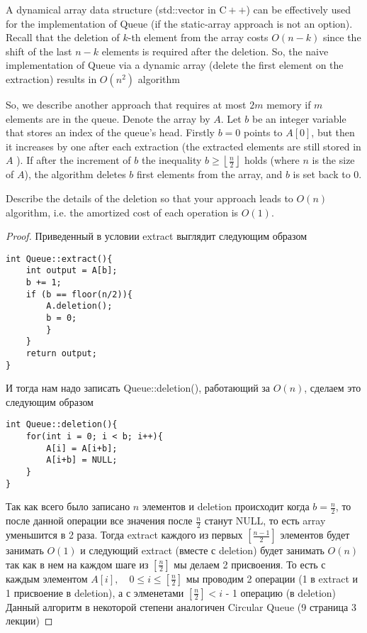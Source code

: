 \begin{prob}
A dynamical array data structure (std::vector in $\mathrm{C}++$) can be effectively used for the implementation of Queue (if the static-array approach is not an option). Recall that the deletion of $k$-th element from the array costs $O(n-k)$ since the shift of the last $n-k$ elements is required after the deletion. So, the naive implementation of Queue via a dynamic array (delete the first element on the extraction) results in $O\left(n^2\right)$ algorithm

So, we describe another approach that requires at most $2 m$ memory if $m$ elements are in the queue. Denote the array by $A$. Let $b$ be an integer variable that stores an index of the queue's head. Firstly $b=0$ points to $A[0]$, but then it increases by one after each extraction (the extracted elements are still stored in $A$ ). If after the increment of $b$ the inequality $b \geqslant \left\lfloor\frac{n}{2}\right\rfloor$ holds (where $n$ is the size of $A$), the algorithm deletes $b$ first elements from the array, and $b$ is set back to 0.

Describe the details of the deletion so that your approach leads to $O(n)$ algorithm, i.e. the amortized cost of each operation is $O(1)$.
\end{prob}
\vskip 0.2in
\begin{proof}
Приведенный в условии extract выглядит следующим образом
\begin{lstlisting}
int Queue::extract(){
    int output = A[b];
    b += 1;
    if (b == floor(n/2)){
        A.deletion();
        b = 0;
        }
    }
    return output;
}
\end{lstlisting}
И тогда нам надо записать Queue::deletion(), работающий за $O(n)$, сделаем это следующим образом
\begin{lstlisting}
int Queue::deletion(){
    for(int i = 0; i < b; i++){
        A[i] = A[i+b];
        A[i+b] = NULL;
    }
}
\end{lstlisting}
Так как всего было записано $n$ элементов и deletion происходит когда $b = \frac{n}{2}$, то после данной операции все значения после $\frac{n}{2}$ станут NULL, то есть array уменьшится в 2 раза. Тогда extract каждого из первых $\left[\frac{n-1}{2}\right]$ элементов будет занимать $O(1)$ и следующий extract (вместе с deletion) будет занимать $O(n)$ так как в нем на каждом шаге из $\left[\frac{n}{2}\right]$ мы делаем 2 присвоения. То есть с каждым элементом $A[i],\quad 0 \leq i \leq \left[\frac{n}{2}\right]$ мы проводим 2 операции (1 в extract и 1 присвоение в deletion), а с элменетами $\left[\frac{n}{2}\right] < i$ - 1 операцию (в deletion) 
Данный алгоритм в некоторой степени аналогичен Circular Queue (9 страница 3 лекции)
\end{proof}
\vskip 0.6in




